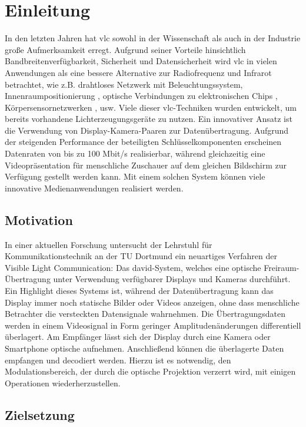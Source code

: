 \chapter{Einleitung} \label{cha:Einleitung}

In den letzten Jahren hat \gls{vlc} sowohl in der Wissenschaft als auch in der Industrie große Aufmerksamkeit erregt. Aufgrund seiner Vorteile hinsichtlich Bandbreitenverfügbarkeit, Sicherheit und Datensicherheit wird \gls{vlc} in vielen Anwendungen als eine bessere Alternative zur Radiofrequenz und Infrarot betrachtet, wie z.B. drahtloses Netzwerk mit Beleuchtungssystem\cite{1205458}, Innenraumpositionierung \cite{4649677}, optische Verbindungen zu elektronischen Chips \cite{867694}, Körpersensornetzwerken \cite{bodysensor}, usw. Viele dieser \gls{vlc}-Techniken wurden entwickelt, um bereits vorhandene Lichterzeugungsgeräte zu nutzen. Ein innovativer Ansatz ist die Verwendung von Display-Kamera-Paaren zur Datenübertragung.\cite{Kays2017} Aufgrund der steigenden Performance der beteiligten Schlüsselkomponenten erscheinen Datenraten von bis zu 100 Mbit/s realisierbar, während gleichzeitig eine Videopräsentation für menschliche Zuschauer auf dem gleichen Bildschirm zur Verfügung gestellt werden kann. Mit einem solchen System können viele innovative Medienanwendungen realisiert werden.

\section{Motivation} 

In einer aktuellen Forschung untersucht der Lehrstuhl für Kommunikationstechnik an der TU Dortmund ein neuartiges Verfahren der Visible Light Communication: Das \gls{david}-System\cite{Kays2016}, welches eine optische Freiraum-Übertragung unter Verwendung verfügbarer Displays und Kameras durchführt. Ein Highlight dieses Systems ist, während der Datenübertragung kann das Display immer noch statische Bilder oder Videos anzeigen, ohne dass menschliche Betrachter die versteckten Datensignale wahrnehmen. Die Übertragungsdaten werden in einem Videosignal in Form geringer Amplitudenänderungen differentiell überlagert. Am Empfänger lässt sich der Display durch eine Kamera oder Smartphone optische aufnehmen. Anschließend können die überlagerte Daten empfangen und decodiert werden. Hierzu ist es notwendig, den Modulationsbereich, der durch die optische Projektion verzerrt wird, mit einigen Operationen wiederherzustellen.

\section{Zielsetzung} 

